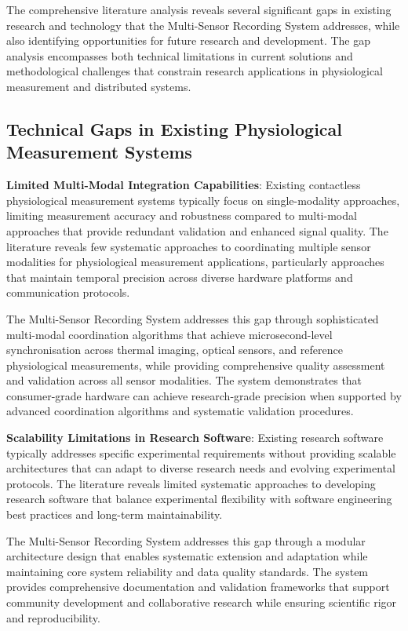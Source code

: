 \documentclass[11pt,a4paper]{report}
\begin{document}
The comprehensive literature analysis reveals several significant gaps in existing research and technology that the Multi-Sensor Recording System addresses, while also identifying opportunities for future research and development. The gap analysis encompasses both technical limitations in current solutions and methodological challenges that constrain research applications in physiological measurement and distributed systems.

\subsection{Technical Gaps in Existing Physiological Measurement Systems}

\noindent \textbf{Limited Multi-Modal Integration Capabilities}: Existing contactless physiological measurement systems typically focus on single-modality approaches, limiting measurement accuracy and robustness compared to multi-modal approaches that provide redundant validation and enhanced signal quality. The literature reveals few systematic approaches to coordinating multiple sensor modalities for physiological measurement applications, particularly approaches that maintain temporal precision across diverse hardware platforms and communication protocols.

The Multi-Sensor Recording System addresses this gap through sophisticated multi-modal coordination algorithms that achieve microsecond-level synchronisation across thermal imaging, optical sensors, and reference physiological measurements, while providing comprehensive quality assessment and validation across all sensor modalities. The system demonstrates that consumer-grade hardware can achieve research-grade precision when supported by advanced coordination algorithms and systematic validation procedures.

\noindent \textbf{Scalability Limitations in Research Software}: Existing research software typically addresses specific experimental requirements without providing scalable architectures that can adapt to diverse research needs and evolving experimental protocols. The literature reveals limited systematic approaches to developing research software that balance experimental flexibility with software engineering best practices and long-term maintainability.

The Multi-Sensor Recording System addresses this gap through a modular architecture design that enables systematic extension and adaptation while maintaining core system reliability and data quality standards. The system provides comprehensive documentation and validation frameworks that support community development and collaborative research while ensuring scientific rigor and reproducibility.
\end{document}
